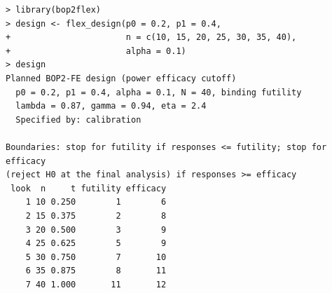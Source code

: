 {\scriptsize
\begin{verbatim}
> library(bop2flex)
> design <- flex_design(p0 = 0.2, p1 = 0.4,
+                       n = c(10, 15, 20, 25, 30, 35, 40),
+                       alpha = 0.1)
> design
Planned BOP2-FE design (power efficacy cutoff) 
  p0 = 0.2, p1 = 0.4, alpha = 0.1, N = 40, binding futility
  lambda = 0.87, gamma = 0.94, eta = 2.4
  Specified by: calibration 

Boundaries: stop for futility if responses <= futility; stop for efficacy
(reject H0 at the final analysis) if responses >= efficacy
 look  n     t futility efficacy
    1 10 0.250        1        6
    2 15 0.375        2        8
    3 20 0.500        3        9
    4 25 0.625        5        9
    5 30 0.750        7       10
    6 35 0.875        8       11
    7 40 1.000       11       12


\end{verbatim}}
